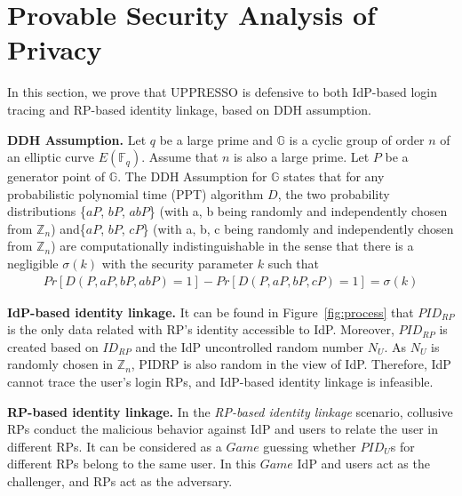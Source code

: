 \section{Provable Security Analysis of Privacy}
\label{sec:privacy}


In this section, we prove that UPPRESSO is defensive to both IdP-based login tracing and RP-based identity linkage, based on DDH assumption\cite{GoldwasserK16}. 


\noindent\textbf{DDH Assumption.}
Let $q$ be a large prime and
$\mathbb{G}$ is a  cyclic group of order $n$ of an elliptic curve $E(\mathbb{F}_q)$. 
Assume that $n$ is also a large prime. Let $P$ be a generator point of $\mathbb{G}$. The DDH Assumption for $\mathbb{G}$ states that for any probabilistic polynomial time (PPT) algorithm $D$, the two probability distributions \{$aP$, $bP$, $abP$\} (with a, b being randomly and independently chosen from $\mathbb{Z}_n$) and\{$aP$, $bP$, $cP$\} (with a, b, c being randomly and independently chosen from $\mathbb{Z}_n$) are computationally indistinguishable in the sense that there is a negligible $\sigma(k)$ with the security parameter $k$ such that
\vspace{-\topsep}
\begin{multline*}
Pr[D(P, aP, bP, abP)=1]-Pr[D(P, aP, bP, cP)=1]=\sigma(k)
\end{multline*}

\vspace{-\topsep}

\noindent\textbf{IdP-based identity linkage.} 
It can be found in Figure~\ref{fig:process} that $PID_{RP}$ is the only data related with RP's identity accessible to IdP. Moreover, $PID_{RP}$ is created based on $ID_{RP}$ and the IdP uncontrolled random number $N_U$. As $N_U$ is randomly chosen in $\mathbb{Z}_n$,  PIDRP is also random in the view of IdP. Therefore, IdP cannot trace the user’s login RPs, and IdP-based identity linkage is infeasible.

\noindent\textbf{RP-based identity linkage.} 
In the \emph{RP-based identity linkage} scenario, collusive RPs conduct the malicious behavior against IdP and users to relate the user in different RPs. It can be considered as a $Game$ guessing whether $PID_U$s for different RPs belong to the same user.  In this $Game$ IdP and users act as the challenger, and RPs act as the adversary. 

